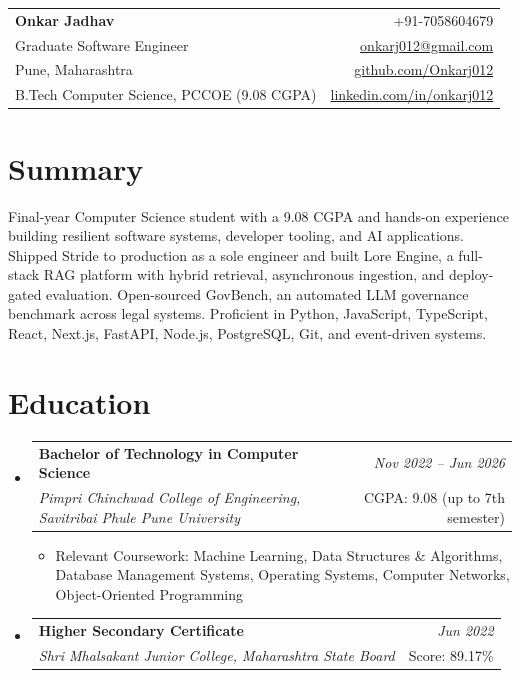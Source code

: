 \documentclass[a4paper,11pt]{article}
\makeatletter
\newcommand{\resumeSubheading}[4]{
\vspace{0.5mm}\item
    \begin{tabular*}{0.98\textwidth}[t]{l@{\extracolsep{\fill}}r}
        \textbf{#1} & \textit{\footnotesize{#4}} \\
        \textit{\footnotesize{#3}} & \footnotesize{#2}\\
    \end{tabular*}
    \vspace{-2.4mm}
}
\newcommand{\resumeSubHeadingListStart}{\begin{itemize}[leftmargin=*,labelsep=0mm]}
\newcommand{\resumeItemListStart}{\begin{justify}\begin{itemize}[leftmargin=3ex, rightmargin=2ex, noitemsep,labelsep=1.2mm,itemsep=0mm]\small}
\newcommand{\resumeSubHeadingListEnd}{\end{itemize}\vspace{2mm}}
\newcommand{\resumeItemListEnd}{\end{itemize}\end{justify}\vspace{-2mm}}
\newcommand{\name}{Onkar Jadhav}
\newcommand{\phone}{7058604679}
\newcommand{\emaila}{onkarj012@gmail.com}
\newcommand{\github}{github.com/Onkarj012}
\newcommand{\linkedin}{linkedin.com/in/onkarj012}
\makeatother
\begin{document}
\selectfont

\begin{tabularx}{\linewidth}{L r}
  \textbf{\Large \name} & +91-\phone\\
  {Graduate Software Engineer} & \href{mailto:\emaila}{\emaila} \\
  {Pune, Maharashtra} & \href{https://\github}{\github} \\
  {B.Tech Computer Science, PCCOE (9.08 CGPA)} & \href{https://\linkedin}{\linkedin}
\end{tabularx}
\vspace{-4mm}

\section{\textbf{Summary}}
\vspace{1mm}
\small{
Final-year Computer Science student with a 9.08 CGPA and hands-on experience building resilient software systems, developer tooling, and AI applications. Shipped Stride to production as a sole engineer and built Lore Engine, a full-stack RAG platform with hybrid retrieval, asynchronous ingestion, and deploy-gated evaluation. Open-sourced GovBench, an automated LLM governance benchmark across legal systems. Proficient in Python, JavaScript, TypeScript, React, Next.js, FastAPI, Node.js, PostgreSQL, Git, and event-driven systems.
}
\vspace{-3mm}

\section{\textbf{Education}}
  \resumeSubHeadingListStart
    \resumeSubheading
      {Bachelor of Technology in Computer Science}{CGPA: 9.08 (up to 7th semester)}
      {Pimpri Chinchwad College of Engineering, Savitribai Phule Pune University}{Nov 2022 -- Jun 2026}
      \resumeItemListStart
        \item {Relevant Coursework: Machine Learning, Data Structures \& Algorithms, Database Management Systems, Operating Systems, Computer Networks, Object-Oriented Programming}
      \resumeItemListEnd
    \resumeSubheading
      {Higher Secondary Certificate}{Score: 89.17\%}
      {Shri Mhalsakant Junior College, Maharashtra State Board}{Jun 2022}
  \resumeSubHeadingListEnd
\vspace{-5.5mm}
\end{document}
